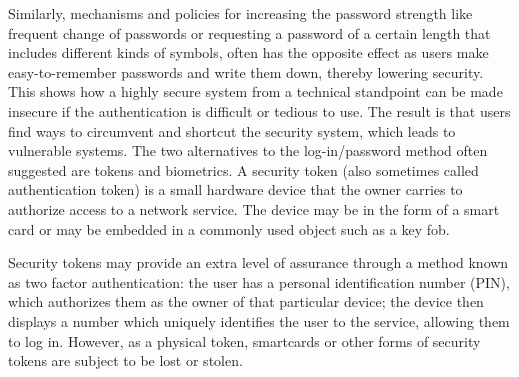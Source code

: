 \documentclass{article}
\begin{document}
Similarly, mechanisms and policies for increasing the password strength like frequent change of passwords or requesting a password of a certain length that includes different kinds of symbols, often has the opposite effect as users make easy-to-remember passwords and write them down, thereby lowering security. This shows how a highly secure system from a technical standpoint can be made insecure if the authentication is difficult or tedious to use. The result is that users find ways to circumvent and shortcut the security system, which leads to vulnerable systems. 
The two alternatives to the log-in/password method often suggested are tokens and biometrics. A security token (also sometimes called authentication token) is a small hardware device that the owner carries to authorize access to a network service. The device may be in the form of a smart card or may be embedded in a commonly used object such as a key fob. 

Security tokens may provide an extra level of assurance through a method known as two factor authentication: the user has a personal identification number (PIN), which authorizes them as the owner of that particular device; the device then displays a number which uniquely identifies the user to the service, allowing them to log in. However, as a physical token, smartcards or other forms of security tokens are subject to be lost or stolen.  
\end{document}

